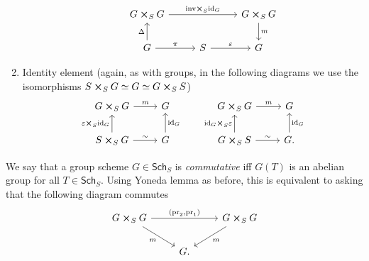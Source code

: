 \begin{rem}[]
\begin{enumerate}
\begin{equation*}
			\qquad
			\begin{tikzcd}[column sep=2.7em]
				G \cross_{ S } G
				\arrow[rr, "\mathrm{inv} \cross_S \mathrm{id}_{ G }", rightarrow] & &
				G \cross_{ S } G \arrow[d, "m", rightarrow] \\
				G \arrow[u, "\Delta", rightarrow] 
				\arrow[r, "\pi", rightarrow] &
				S \arrow[r, "\varepsilon", rightarrow] & 
				G
			\end{tikzcd}
			\end{equation*} 
		\item Identity element (again, as with groups, in the following diagrams
			we use the isomorphisms
			$S \cross_{ S } G \simeq G \simeq G \cross_{ S } S$)
			\begin{equation*}
			\begin{tikzcd}
				G \cross_{ S } G \arrow[r, "m", rightarrow] &
				G \\
				S \cross_{ S } G \arrow[r, "\sim", rightarrow] 
				\arrow[u, "\varepsilon \cross_S \mathrm{id}_{ G }", rightarrow] &
				G \arrow[u, "\mathrm{id}_{ G }"', rightarrow] 
			\end{tikzcd}
			\qquad
			\begin{tikzcd}
				G \cross_{ S } G \arrow[r, "m", rightarrow] &
				G \\
				G \cross_{ S } S \arrow[r, "\sim", rightarrow] 
				\arrow[u, "\mathrm{id}_{ G } \cross_S \varepsilon", rightarrow] &
				G. \arrow[u, "\mathrm{id}_{ G }"', rightarrow] 
			\end{tikzcd}
			\end{equation*} 
	\end{enumerate}
\end{rem}


\begin{defn}
	We say that a group scheme $G \in \mathsf{Sch}_{ S }$ is {\em commutative}
	iff $G(T)$ is an abelian group for all $T \in \mathsf{Sch}_{ S }$.
	Using Yoneda lemma as before,
	this is equivalent to asking that the following diagram commutes
	\begin{equation*}
	\begin{tikzcd}
		G \cross_S G \arrow[rr, "{ \left(\mathrm{pr}_2, \mathrm{pr}_1\right)}", rightarrow] 
		\arrow[rd, "m"', rightarrow] & &
		G \cross_{ S } G
		\arrow[ld, "m", rightarrow] \\
					     &
		G
	.\end{tikzcd}
	\end{equation*}
\end{defn}



